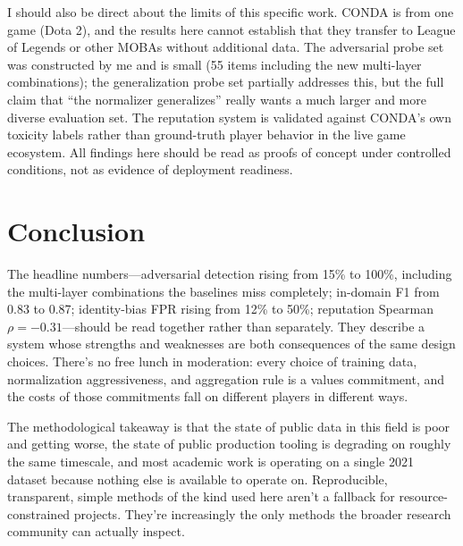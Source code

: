 \documentclass[11pt,twocolumn,letterpaper]{article}
\begin{document}
I should also be direct about the limits of this specific work. CONDA is from one game (Dota 2), and the results here cannot establish that they transfer to League of Legends or other MOBAs without additional data. The adversarial probe set was constructed by me and is small (55 items including the new multi-layer combinations); the generalization probe set partially addresses this, but the full claim that ``the normalizer generalizes'' really wants a much larger and more diverse evaluation set. The reputation system is validated against CONDA's own toxicity labels rather than ground-truth player behavior in the live game ecosystem. All findings here should be read as proofs of concept under controlled conditions, not as evidence of deployment readiness.

\section{Conclusion}

The headline numbers---adversarial detection rising from 15\% to 100\%, including the multi-layer combinations the baselines miss completely; in-domain F1 from 0.83 to 0.87; identity-bias FPR rising from 12\% to 50\%; reputation Spearman $\rho = -0.31$---should be read together rather than separately. They describe a system whose strengths and weaknesses are both consequences of the same design choices. There's no free lunch in moderation: every choice of training data, normalization aggressiveness, and aggregation rule is a values commitment, and the costs of those commitments fall on different players in different ways.

The methodological takeaway is that the state of public data in this field is poor and getting worse, the state of public production tooling is degrading on roughly the same timescale, and most academic work is operating on a single 2021 dataset because nothing else is available to operate on. Reproducible, transparent, simple methods of the kind used here aren't a fallback for resource-constrained projects. They're increasingly the only methods the broader research community can actually inspect.
\end{document}
